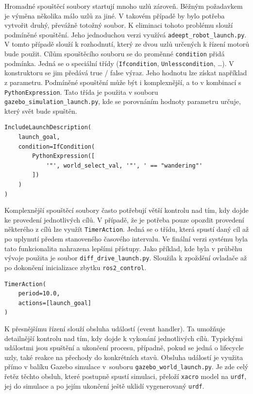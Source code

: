 Hromadné spouštěcí soubory startují mnoho uzlů zároveň. Běžným požadavkem je výměna několika málo uzlů za jiné. V takovém případě by bylo potřeba vytvořit druhý, převážně totožný soubor. K eliminaci tohoto problému slouží podmíněné spouštění. Jeho jednoduchou verzi využívá \verb|adeept_robot_launch.py|. V tomto případě slouží k rozhodnutí, který ze dvou uzlů určených k řízení motorů bude použit. Cílům spouštěcího souboru se do proměnné \verb|condition| přidá podmínka. Jedná se o speciální třídy (\verb|Ifcondition|, \verb|Unlesscondition|, \dots). V konstruktoru se jim předává true / false výraz. Jeho hodnotu lze získat například z parametru. Podmíněné spouštění může být i komplexnější, a to v kombinací s \verb|PythonExpression|. Tato třída je použita v souboru \verb|gazebo_simulation_launch.py|, kde se porovnáním hodnoty parametru určuje, který svět bude spuštěn.
\begin{verbatim}
IncludeLaunchDescription(
    launch_goal,
    condition=IfCondition(
        PythonExpression([
            '"', world_select_val, '"', ' == "wandering"'
        ])
    )
)
\end{verbatim}

Komplexnější spouštěcí soubory často potřebují větší kontrolu nad tím, kdy dojde ke provedení jednotlivých cílů. V případě, že je potřeba pouze opozdit provedení některého z cílů lze využít \verb|TimerAction|. Jedná se o třídu, která spustí daný cíl až po uplynutí předem stanoveného časového intervalu. Ve finální verzi systému byla tato funkcionalita nahrazena lepšími přístupy. Jako příklad, kde byla v průběhu vývoje použita je soubor \verb|diff_drive_launch.py|. Sloužila k zpoždění  ovladače až po dokončení inicializace zbytku \verb|ros2_control|.
\begin{verbatim}
TimerAction(
    period=10.0,
    actions=[launch_goal]
)
\end{verbatim}

K přesnějšímu řízení slouží obsluha událostí (event handler). Ta umožňuje detailnější kontrolu nad tím, kdy dojde k vykonání jednotlivých cílů. Typickými událostmi jsou spuštění a ukončení procesu, případně, pokud se jedná o lifecycle uzly, také reakce na přechody do konkrétních stavů. Obsluha událostí je využita přímo v balíku Gazebo simulace v~souboru \verb|gazebo_world_launch.py|. Je zde celý řetěz těchto obsluh, které postupně spustí simulaci, přeloží \verb|xacro| model na \verb|urdf|,  jej do simulace a po jejím ukončení ještě uklidí vygenerovaný \verb|urdf|.

